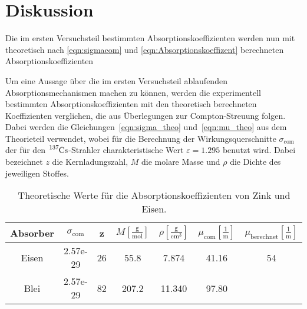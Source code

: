 \section{Diskussion}
\label{sec:Diskussion}

Die im ersten Versuchsteil bestimmten Absorptionskoeffizienten werden nun mit theoretisch nach \autoref{eqn:sigmacom} und
\autoref{eqn:Absorptionskoeffizent} berechneten Absorptionskoeffizienten 


Um eine Aussage über die im ersten Versuchsteil ablaufenden Absorptionsmechanismen
machen zu können, werden die experimentell bestimmten Absorptionskoeffizienten
mit den theoretisch berechneten Koeffizienten verglichen, die aus Überlegungen
zur Compton-Streuung folgen. Dabei werden die Gleichungen~\eqref{eqn:sigma_theo}
und~\eqref{eqn:mu_theo} aus dem Theorieteil verwendet, wobei für die Berechnung
der Wirkungsquerschnitte $\sigma_{\mathup{com}}$ der für den
$\ce{^{137}Cs}$-Strahler charakteristische Wert $\varepsilon = \num{1.295}$
benutzt wird. Dabei bezeichnet $z$ die
Kernladungszahl, $M$ die molare Masse und $\rho$ die Dichte des jeweiligen
Stoffes.


\begin{table}[ht]
    \centering
    \caption{Theoretische Werte für die Absorptionskoeffizienten von Zink und Eisen.}
    \label{tab:theoriewerte}
	\begin{tabular}{S S S S S S S}
			\toprule
			{Absorber} & {$\sigma_{\mathup{com}}$} & {z} & {$M\left[\frac{\si{\gram}}{\si{\mol}}\right]$} &
            {$\rho\left[\frac{\si{\gram}}{\si{\centi\meter\cubed}}\right]$} &
            {$\mu_{\mathup{com}}\left[\frac{1}{\si{\meter}}\right]$} &
            {$\mu_{\mathup{berechnet}}\left[\frac{1}{\si{\meter}}\right]$} \\
			\midrule
			{Eisen} & 2.57e-29 & 26 &  55.8 &  7.874 & 41.16  & 54\\
            {Blei}  & 2.57e-29 & 82 & 207.2 & 11.340 & 97.80 &  \\
			\bottomrule
		\end{tabular}
\end{table}
